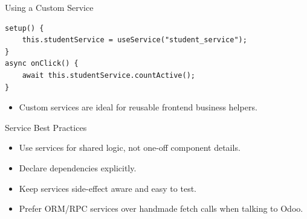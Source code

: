 \begin{frame}[fragile]{Using a Custom Service}
\begin{lstlisting}[style=js]
setup() {
	this.studentService = useService("student_service");
}
async onClick() {
	await this.studentService.countActive();
}
\end{lstlisting}
	\begin{itemize}
		\item Custom services are ideal for reusable frontend business helpers.
	\end{itemize}
\end{frame}

\begin{frame}{Service Best Practices}
	\begin{itemize}
		\item Use services for shared logic, not one-off component details.
		\item Declare dependencies explicitly.
		\item Keep services side-effect aware and easy to test.
		\item Prefer ORM/RPC services over handmade fetch calls when talking to Odoo.
	\end{itemize}
\end{frame}
